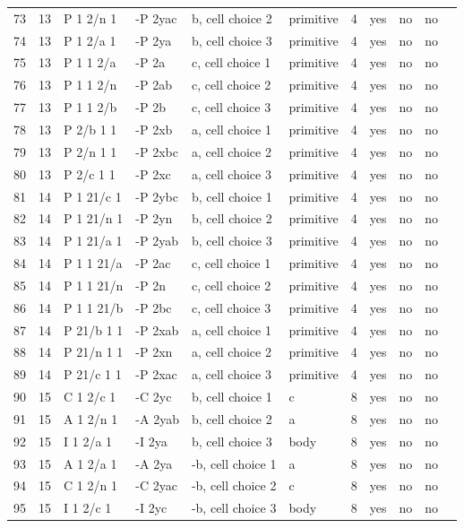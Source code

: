\begin{center}
\begin{small}
\begin{longtable}{|l|l|l|l|l|l|l|l|l|l|l|}
73 &13 &P 1 2/n 1 &-P 2yac &b, cell choice 2 &primitive &4 &yes &no &no \\ 
74 &13 &P 1 2/a 1 &-P 2ya &b, cell choice 3 &primitive &4 &yes &no &no \\ 
75 &13 &P 1 1 2/a &-P 2a &c, cell choice 1 &primitive &4 &yes &no &no \\ 
76 &13 &P 1 1 2/n &-P 2ab &c, cell choice 2 &primitive &4 &yes &no &no \\ 
77 &13 &P 1 1 2/b &-P 2b &c, cell choice 3 &primitive &4 &yes &no &no \\ 
78 &13 &P 2/b 1 1 &-P 2xb &a, cell choice 1 &primitive &4 &yes &no &no \\ 
79 &13 &P 2/n 1 1 &-P 2xbc &a, cell choice 2 &primitive &4 &yes &no &no \\ 
80 &13 &P 2/c 1 1 &-P 2xc &a, cell choice 3 &primitive &4 &yes &no &no \\ 
81 &14 &P 1 21/c 1 &-P 2ybc &b, cell choice 1 &primitive &4 &yes &no &no \\ 
82 &14 &P 1 21/n 1 &-P 2yn &b, cell choice 2 &primitive &4 &yes &no &no \\ 
83 &14 &P 1 21/a 1 &-P 2yab &b, cell choice 3 &primitive &4 &yes &no &no \\ 
84 &14 &P 1 1 21/a &-P 2ac &c, cell choice 1 &primitive &4 &yes &no &no \\ 
85 &14 &P 1 1 21/n &-P 2n &c, cell choice 2 &primitive &4 &yes &no &no \\ 
86 &14 &P 1 1 21/b &-P 2bc &c, cell choice 3 &primitive &4 &yes &no &no \\ 
87 &14 &P 21/b 1 1 &-P 2xab &a, cell choice 1 &primitive &4 &yes &no &no \\ 
88 &14 &P 21/n 1 1 &-P 2xn &a, cell choice 2 &primitive &4 &yes &no &no \\ 
89 &14 &P 21/c 1 1 &-P 2xac &a, cell choice 3 &primitive &4 &yes &no &no \\ 
90 &15 &C 1 2/c 1 &-C 2yc &b, cell choice 1 &c &8 &yes &no &no \\ 
91 &15 &A 1 2/n 1 &-A 2yab &b, cell choice 2 &a &8 &yes &no &no \\ 
92 &15 &I 1 2/a 1 &-I 2ya &b, cell choice 3 &body &8 &yes &no &no \\ 
93 &15 &A 1 2/a 1 &-A 2ya &-b, cell choice 1 &a &8 &yes &no &no \\ 
94 &15 &C 1 2/n 1 &-C 2yac &-b, cell choice 2 &c &8 &yes &no &no \\ 
95 &15 &I 1 2/c 1 &-I 2yc &-b, cell choice 3 &body &8 &yes &no &no \\ 

\end{longtable}
\end{small}
\end{center}
